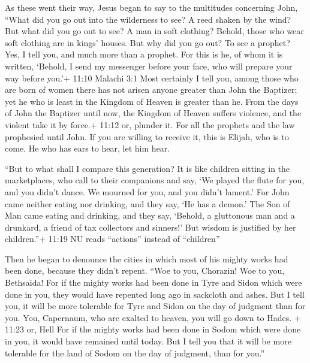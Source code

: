  As these went their way, Jesus began to say to the
multitudes concerning John, ``What did you go out into the wilderness to
see? A reed shaken by the wind?  But what did you go out to
see? A man in soft clothing? Behold, those who wear soft clothing are in
kings' houses.  But why did you go out? To see a prophet?
Yes, I tell you, and much more than a prophet.  For this is
he, of whom it is written, `Behold, I send my messenger before your
face, who will prepare your way before you.'+ 11:10 Malachi 3:1
 Most certainly I tell you, among those who are born of
women there has not arisen anyone greater than John the Baptizer; yet he
who is least in the Kingdom of Heaven is greater than he. 
From the days of John the Baptizer until now, the Kingdom of Heaven
suffers violence, and the violent take it by force.+ 11:12 or, plunder
it.  For all the prophets and the law prophesied until
John.  If you are willing to receive it, this is Elijah,
who is to come.  He who has ears to hear, let him hear.

 ``But to what shall I compare this generation? It is like
children sitting in the marketplaces, who call to their companions
 and say, `We played the flute for you, and you didn't
dance. We mourned for you, and you didn't lament.'  For
John came neither eating nor drinking, and they say, `He has a demon.'
 The Son of Man came eating and drinking, and they say,
`Behold, a gluttonous man and a drunkard, a friend of tax collectors and
sinners!' But wisdom is justified by her children.''+ 11:19 NU reads
``actions'' instead of ``children''

 Then he began to denounce the cities in which most of his
mighty works had been done, because they didn't repent. 
``Woe to you, Chorazin! Woe to you, Bethsaida! For if the mighty works
had been done in Tyre and Sidon which were done in you, they would have
repented long ago in sackcloth and ashes.  But I tell you,
it will be more tolerable for Tyre and Sidon on the day of judgment than
for you.  You, Capernaum, who are exalted to heaven, you
will go down to Hades. + 11:23 or, Hell For if the mighty works had been
done in Sodom which were done in you, it would have remained until
today.  But I tell you that it will be more tolerable for
the land of Sodom on the day of judgment, than for you.''

